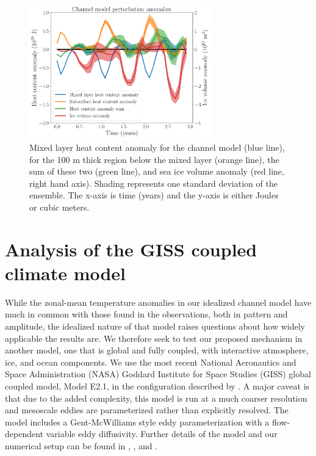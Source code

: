 \documentclass{ametsocV5}
\begin{document}
\begin{figure}[!ht]
    \begin{center}
        \includegraphics[width=0.7\textwidth]{figures/channel_model_OHC_and_ice_anoms.pdf}
        \caption{Mixed layer heat content anomaly for the channel model (blue line), for the 100 m thick region below the mixed layer (orange line), the sum of these two (green line), and sea ice volume anomaly (red line, right hand axis). Shading represents one standard deviation of the ensemble. The x-axis is time (years) and the y-axis is either Joules or cubic meters.}
        \label{fig:channel_model_OHC_and_ice_anoms}
    \end{center}
\end{figure}



\section{Analysis of the GISS coupled climate model} %
\label{sec:analysis_of_a_global_coupled_model}

While the zonal-mean temperature anomalies in our idealized channel model have much in common with those found in the observations, both in pattern and amplitude, the idealized nature of that model raises questions about how widely applicable the results are. We therefore seek to test our proposed mechanism in another model, one that is global and fully coupled, with interactive atmosphere, ice, and ocean components. We use the most recent National Aeronautics and Space Administration (NASA) Goddard Institute for Space Studies (GISS) global coupled model, Model E2.1, in the configuration described by \citet{Doddridge2019a}. A major caveat is that due to the added complexity, this model is run at a much coarser resolution and mesoscale eddies are parameterized rather than explicitly resolved. The model includes a Gent-McWilliams style eddy parameterization \citep{Gent1990,Gent1995} with a flow-dependent variable eddy diffusivity. Further details of the model and our numerical setup can be found in \citet{Doddridge2019a}, \citet{Kelley2020}, and \citet{Miller2020}.
\end{document}
